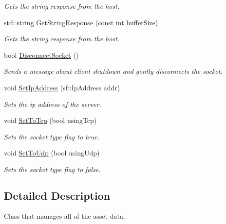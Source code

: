 \begin{DoxyCompactItemize}
\begin{DoxyCompactList}\small\item\em Gets the string response from the host. \end{DoxyCompactList}\item 
std\+::string \mbox{\hyperlink{class_arktis_engine_1_1_messaging_manager_a73d16428395e9e93615021dfc04e7200}{Get\+String\+Response}} (const int buffer\+Size)
\begin{DoxyCompactList}\small\item\em Gets the string response from the host. \end{DoxyCompactList}\item 
bool \mbox{\hyperlink{class_arktis_engine_1_1_messaging_manager_aa06733c45d3e14055bf48ba8bdb74c8d}{Disconnect\+Socket}} ()
\begin{DoxyCompactList}\small\item\em Sends a message about client shutdown and gently disconnects the socket. \end{DoxyCompactList}\item 
void \mbox{\hyperlink{class_arktis_engine_1_1_messaging_manager_a31cacbae868864fcd2a6bc4070919a8c}{Set\+Ip\+Address}} (sf\+::\+Ip\+Address addr)
\begin{DoxyCompactList}\small\item\em Sets the ip address of the server. \end{DoxyCompactList}\item 
void \mbox{\hyperlink{class_arktis_engine_1_1_messaging_manager_ae420b8cb11c0015a35462adecb9ff3bf}{Set\+To\+Tcp}} (bool using\+Tcp)
\begin{DoxyCompactList}\small\item\em Sets the socket type flag to true. \end{DoxyCompactList}\item 
void \mbox{\hyperlink{class_arktis_engine_1_1_messaging_manager_a13dfdd0dedb881e64364351c24c6ecb3}{Set\+To\+Udp}} (bool using\+Udp)
\begin{DoxyCompactList}\small\item\em Sets the socket type flag to false. \end{DoxyCompactList}\end{DoxyCompactItemize}


\subsection{Detailed Description}
Class that manages all of the asset data. 

